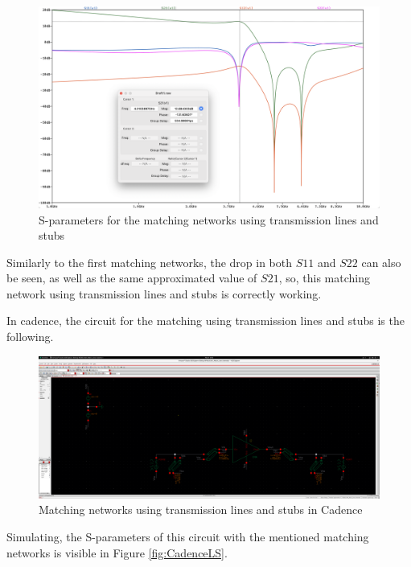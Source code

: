 \begin{figure}[H]
    \centering
    \includegraphics*[scale = 0.3]{Images/SIMLSmatching.png}
    \caption{S-parameters for the matching networks using transmission lines and stubs}
    \label{fig:SIMLSMatching}
\end{figure}

Similarly to the first matching networks, the drop in both $S11$ and $S22$ can also be seen, as well as the same approximated value of $S21$, so, this matching network using transmission lines and stubs is correctly working. 

In cadence, the circuit for the matching using transmission lines and stubs is the following.

\begin{figure}[H]
    \centering
    \includegraphics*[scale = 0.1]{Images/CadenceLScircuit.png}
    \caption{Matching networks using transmission lines and stubs in Cadence}
    \label{fig:CadenceLCcircuit}
\end{figure}

Simulating, the S-parameters of this circuit with the mentioned matching networks is visible in Figure \ref{fig:CadenceLS}.


